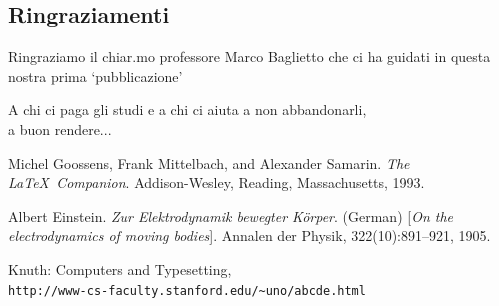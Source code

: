 \documentclass[a4paper,11pt,twoside]{book}
\newenvironment{abstract}
{\cleardoublepage
	\thispagestyle{empty}
	\null \vfill
	\begin{center}
		\bfseries \abstractname 
	\end{center}}
{\vfill\null}
\begin{document}
\vfill


\newpage\null\thispagestyle{empty}\newpage

\frontmatter
\thispagestyle{empty}
\null{}
\begin{center}
	\section*{Ringraziamenti}
		Ringraziamo il chiar.mo professore Marco Baglietto che ci ha guidati in questa nostra prima `pubblicazione'
\end{center}
\null
\newpage
\begin{flushright}
	\null{}
	A chi ci paga gli studi e a chi ci aiuta a non abbandonarli,\\ a buon rendere...
	\null
\end{flushright}
\begin{abstract}
	\begin{center}
		
	\end{center}
\end{abstract}

\tableofcontents
\listoffigures

\mainmatter







\begin{thebibliography}{9}

	Michel Goossens, Frank Mittelbach, and Alexander Samarin. 
	\textit{The \LaTeX\ Companion}. 
	Addison-Wesley, Reading, Massachusetts, 1993.
	
	Albert Einstein. 
	\textit{Zur Elektrodynamik bewegter K{\"o}rper}. (German) 
	[\textit{On the electrodynamics of moving bodies}]. 
	Annalen der Physik, 322(10):891–921, 1905.
	
	Knuth: Computers and Typesetting,
	\\\texttt{http://www-cs-faculty.stanford.edu/\~{}uno/abcde.html}
\end{thebibliography}
\end{document}
